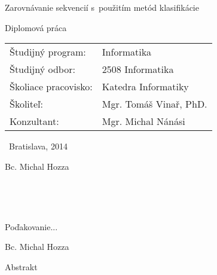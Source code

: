 \documentclass[a4paper,12pt,openany,oneside,headings=optiontohead]{scrbook} %
\theoremstyle{definition}
\def\mftitle{Zarovnávanie sekvencií s~použitím metód klasifikácie}
\def\mfthesistype{Diplomová práca}
\def\mfauthor{Bc. Michal Hozza}
\def\mfadvisor{Mgr. Tomáš Vinař, PhD.}
\def\mfconsultant{Mgr. Michal Nánási}
\def\mfdate{2014}
\def\mfplacedate{Bratislava, \mfdate}
\begin{document}
\vfill
\begin{center}
\begin{minipage}{1\textwidth}
\bigskip\bigskip
\begin{center}
\linespread{1}\LARGE\sc\mftitle
\end{center}
\smallskip
\centerline{\mfthesistype}
\bigskip
\bigskip
\bigskip\bigskip
\end{minipage}
\end{center}
\vfill
\begin{minipage}{0.8\textwidth}
\begin{tabular}{l l}
Študijný program:& Informatika \\
Študijný odbor:& 2508 Informatika \\
Školiace pracovisko:& Katedra Informatiky\\
Školiteľ:&   \mfadvisor \\
Konzultant:&   \mfconsultant \\
\end{tabular}
\end{minipage}
\vfill
{\bf
\begin{minipage}{0.4\textwidth}
\begin{flushleft} \large
~\mfplacedate
\end{flushleft}
\end{minipage}
\begin{minipage}{0.59\textwidth}
\begin{flushright} \large
\mfauthor
\end{flushright}
\end{minipage}
}
\eject %

%

{~}\vspace{12cm}

\noindent
\begin{minipage}{0.25\textwidth}~\end{minipage}
\begin{center}
\begin{minipage}{1\textwidth}
Poďakovanie...
\end{minipage}
\end{center}
\hfill\mfauthor
\vfill\eject %


\noindent
\begin{center}
\begin{minipage}{1\textwidth}
\centerline{\large Abstrakt}

\end{minipage}
\end{center}
\eject %
\end{document}
